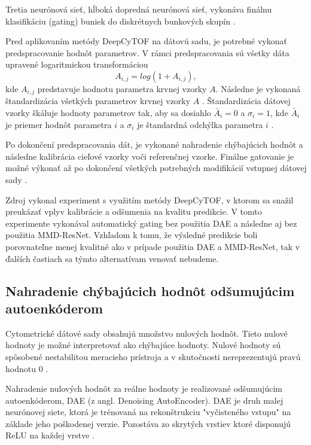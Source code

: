Tretia neurónová sieť, hĺboká dopredná neurónová sieť, vykonáva finálnu klasifikáciu (gating) buniek do diskrétnych bunkových skupín \cite{Li2017}.

Pred aplikovaním metódy DeepCyTOF na dátovú sadu, je potrebné vykonať predspracovanie hodnôt parametrov. V rámci predspracovania sú všetky dáta upravené logaritmickou transformáciou
\begin{equation}
    A_{i,j} = log(1+A_{i,j}),
\end{equation}
kde $A_{i,j}$ predstavuje hodnotu parametra krvnej vzorky $A$. Následne je vykonaná štandardizácia všetkých parametrov krvnej vzorky $A$ \cite{Li2016, Li2017}. Štandardizácia dátovej vzorky škáluje hodnoty parametrov tak, aby sa dosiahlo $\bar{A}_i=0$ a $\sigma_i=1$, kde $\bar{A}_i$ je priemer hodnôt parametra $i$ a $\sigma_i$ je štandardná odchýlka parametra $i$ \cite{Aksoy}.

Po dokončení predspracovania dát, je vykonané nahradenie chýbajúcich hodnôt a následne kalibrácia cieľové vzorky voči referenčnej vzorke. Finálne gatovanie je možné výkonať až po dokončení všetkých potrebných modifikácií vstupnej dátovej sady \cite{Li2017}. 

Zdroj \cite{Li2017} vykonal experiment s využitím metódy DeepCyTOF, v ktorom sa snažil preukázať vplyv kalibrácie a odšumenia na kvalitu predikcie. V tomto experimente vykonával automatický gating bez použitia DAE a následne aj bez použitia MMD-ResNet. Vzhľadom k tomu, že výsledné predikcie boli porovnateľne menej kvalitné ako v prípade použitia DAE a MMD-ResNet, tak v ďalších častiach sa týmto alternatívam venovať nebudeme.

\subsection{Nahradenie chýbajúcich hodnôt odšumujúcim autoenkóderom}

Cytometrické dátové sady obsahujú množstvo nulových hodnôt. Tieto nulové hodnoty je možné interpretovať ako chýbajúce hodnoty. Nulové hodnoty sú spôsobené nestabilitou meracieho prístroja a v skutočnosti nereprezentujú pravú hodnotu 0 \cite{Li2017}.

Nahradenie nulových hodnôt za reálne hodnoty je realizované odšumujúcim autoenkóderom, DAE (z angl. Denoising AutoEncoder). DAE je druh malej neurónovej siete, ktorá je trénovaná na rekonštrukciu "vyčisteného vstupu" na základe jeho poškodenej verzie. Pozostáva zo skrytých vrstiev ktoré disponujú ReLU na každej vrstve \cite{Li2017}.

